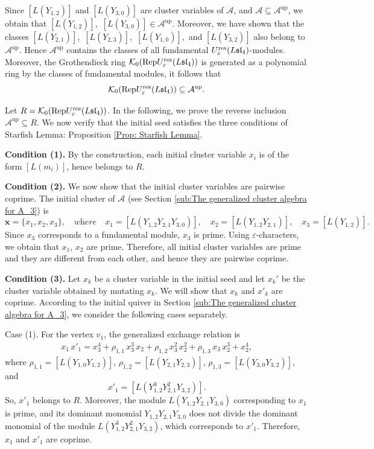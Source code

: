 \documentclass[11pt, reqno]{amsart}
\theoremstyle{plain}
\theoremstyle{definition}
\numberwithin{equation}{section}
\newcommand{\res}{{\rm res}}
\newcommand{\Rep}{{\rm Rep}}
\begin{document}
Since $[L(Y_{1,2})]$ and $[L(Y_{3,0})]$ are cluster variables of $\mathcal{A}$, and $\mathcal{A} \subseteq \mathcal{A}^{\mathrm{up}}$, we obtain that $[L(Y_{1,2})]$,\, $[L(Y_{3,0})] \in \mathcal{A}^{\mathrm{up}}$.
Moreover, we have shown that the classes $[L(Y_{2,1})]$,\ $[L(Y_{2,3})]$,\ $[L(Y_{1,0})]$,\ and $[L(Y_{3,2})]$ also belong to $\mathcal{A}^{\mathrm{up}}$. Hence $\mathcal{A}^{\mathrm{up}}$ contains the classes of all fundamental $U_{\varepsilon}^{\res}(L\mathfrak{sl}_4)$-modules. Moreover, the Grothendieck ring
$\mathcal{K}_0(\Rep U_{\varepsilon}^{\res}(L\mathfrak{sl}_4))$ is generated as a polynomial ring by the classes of fundamental modules, it follows that
\[
\mathcal{K}_0(\Rep U_{\varepsilon}^{\res}(L\mathfrak{sl}_4))
\subseteq \mathcal{A}^{\mathrm{up}}.
\]

Let $R=\mathcal{K}_0(\Rep U_{\varepsilon}^{\res}(L\mathfrak{sl}_4))$. In the following, we prove the reverse inclusion $\mathcal{A}^{\mathrm{up}} \subseteq R$. We now verify that the initial seed satisfies the three conditions of Starfish Lemma: Proposition \ref{Prop: Starfish Lemma}.

{\bf Condition (1).} By the construction, each initial cluster variable $x_i$ is of the form $[L(m_i)]$, hence belongs to $R$. 

{\bf Condition (2).}  We now show that the initial cluster variables are pairwise coprime. The initial cluster of $\mathcal{A}$ (see Section \ref{sub:The generalized cluster algebra for A_3}) is
\[
\mathbf{x}=\{x_1,x_2,x_3\},\quad\textit{where} \quad
x_1=[L(Y_{1,2}Y_{2,1}Y_{3,0})],\quad
x_2=[L(Y_{1,2}Y_{2,1})],\quad
x_3=[L(Y_{1,2})].
\]
Since $x_3$ corresponds to a fundamental module, $x_3$ is prime. Using $\varepsilon$-characters, we  obtain that $x_1$, $x_2$ are prime. Therefore, all initial cluster variables are prime and they are different from each other, and hence they are pairwise coprime.

{\bf Condition (3).} Let $x_k$ be a cluster variable in the initial seed and let $x_k'$ be the cluster variable obtained by mutating $x_k$. We will show that $x_k$ and $x'_k$ are coprime. According to the initial quiver in Section \ref{sub:The generalized cluster algebra for A_3}, we consider the following cases separately. 

Case (1). For the vertex $v_1$, the generalized exchange relation is
\begin{align}\label{x1 of A3}
x_1\,x'_1=x_3^4+\rho_{1,1}\,x_3^3\,x_2+\rho_{1,2}\,x_3^2\,x_2^2+\rho_{1,3}\,x_3\,x_2^3+x_2^4,
\end{align}
where $\rho_{1,1}=[L(Y_{1,0}Y_{1,2})]$, $\rho_{1,2}=[L(Y_{2,1}Y_{2,3})]$, $\rho_{1,3}=[L(Y_{3,0}Y_{3,2})]$, and 
\[
x'_1=[L(Y^3_{1,2}Y^2_{2,1}Y_{3,2})].
\]
So, $x'_1$ belongs to $R$. Moreover, the module $L(Y_{1,2}Y_{2,1}Y_{3,0})$ corresponding to $x_1$ is prime, and its dominant monomial $Y_{1,2}Y_{2,1}Y_{3,0}$ does not divide the dominant monomial of the module $L(Y^3_{1,2}Y^2_{2,1}Y_{3,2})$, which corresponds to $x'_1$. Therefore, $x_1$ and $x'_1$ are coprime.
\end{document}
